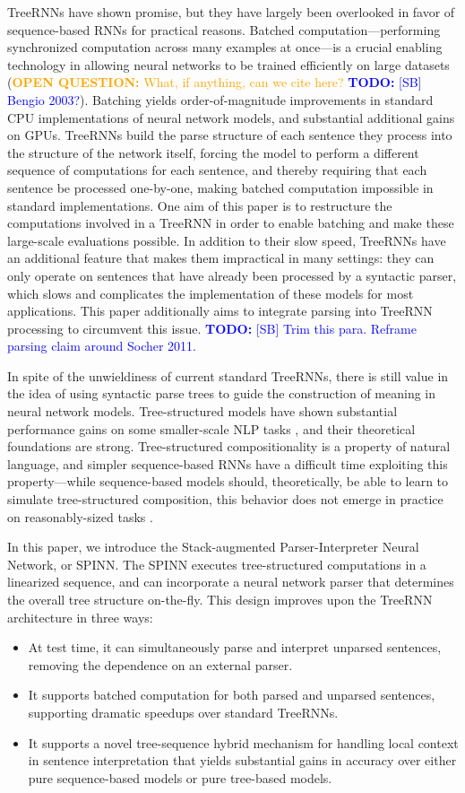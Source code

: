 \documentclass[11pt]{article}
\newcommand\todo[1]{\textcolor{blue}{\textbf{TODO:} #1}}
\newcommand\question[1]{\textcolor{orange}{\textbf{OPEN QUESTION:} #1}}
\begin{document}
TreeRNNs have shown promise, but they have largely been overlooked in favor of sequence-based RNNs for practical reasons. Batched computation---performing synchronized computation across many examples at once---is a crucial enabling technology in allowing neural networks to be trained efficiently on large datasets (\question{What, if anything, can we cite here?} \todo{[SB] Bengio 2003?}). Batching yields order-of-magnitude improvements in standard CPU implementations of neural network models, and substantial additional gains on GPUs. TreeRNNs build the parse structure of each sentence they process into the structure of the network itself, forcing the model to perform a different sequence of computations for each sentence, and thereby requiring that each sentence be processed one-by-one, making batched computation impossible in standard implementations. One aim of this paper is to restructure the computations involved in a TreeRNN in order to enable batching and make these large-scale evaluations possible.  In addition to their slow speed, TreeRNNs have an additional feature that makes them impractical in many settings: they can only operate on sentences that have already been processed by a syntactic parser, which slows and complicates the implementation of these models for most applications. This paper additionally aims to integrate parsing into TreeRNN processing to circumvent this issue. \todo{[SB] Trim this para. Reframe parsing claim around Socher 2011.}

In spite of the unwieldiness of current standard TreeRNNs, there is still value in the idea of using syntactic parse trees to guide the construction of meaning in neural network models. Tree-structured models have shown substantial performance gains on some smaller-scale NLP tasks \citep{tai2015improved,li2015tree}, and their theoretical foundations are strong. Tree-structured compositionality is a property of natural language, and simpler sequence-based RNNs have a difficult time exploiting this property---while sequence-based models should, theoretically, be able to learn to simulate tree-structured composition, this behavior does not emerge in practice on reasonably-sized tasks \citep{bowman2015trees}. 

In this paper, we introduce the Stack-augmented Parser-Interpreter Neural Network, or SPINN. The SPINN executes tree-structured computations in a linearized sequence, and can incorporate a neural network parser that determines the overall tree structure on-the-fly. This design improves upon the TreeRNN architecture in three ways:
\begin{itemize}
\item At test time, it can simultaneously parse and interpret unparsed sentences, removing the dependence on an external parser.
\item It supports batched computation for both parsed and unparsed sentences, supporting dramatic speedups over standard TreeRNNs.
\item It supports a novel tree-sequence hybrid mechanism for handling local context in sentence interpretation that yields substantial gains in accuracy over either pure sequence-based models or pure tree-based models.
\end{itemize}
\end{document}
